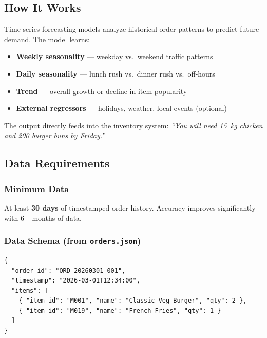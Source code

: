 \documentclass[12pt, a4paper]{article}
\begin{document}
\subsection{How It Works}

Time-series forecasting models analyze historical order patterns to predict future demand. The model learns:

\begin{itemize}[nosep]
    \item \textbf{Weekly seasonality} --- weekday vs.\ weekend traffic patterns
    \item \textbf{Daily seasonality} --- lunch rush vs.\ dinner rush vs.\ off-hours
    \item \textbf{Trend} --- overall growth or decline in item popularity
    \item \textbf{External regressors} --- holidays, weather, local events (optional)
\end{itemize}

The output directly feeds into the inventory system: \textit{``You will need 15~kg chicken and 200 burger buns by Friday.''}


\subsection{Data Requirements}

\subsubsection{Minimum Data}
At least \textbf{30 days} of timestamped order history. Accuracy improves significantly with 6+ months of data.

\subsubsection{Data Schema (from \texttt{orders.json})}
\begin{lstlisting}
{
  "order_id": "ORD-20260301-001",
  "timestamp": "2026-03-01T12:34:00",
  "items": [
    { "item_id": "M001", "name": "Classic Veg Burger", "qty": 2 },
    { "item_id": "M019", "name": "French Fries", "qty": 1 }
  ]
}
\end{lstlisting}
\end{document}
